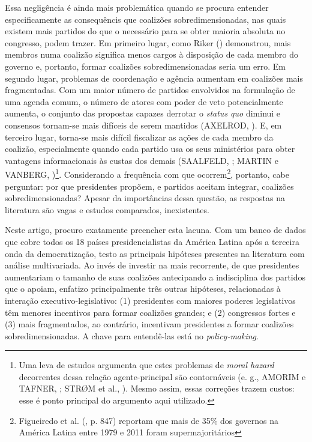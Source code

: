 Essa negligência é ainda mais problemática quando se procura entender especificamente as consequêncis que coalizões sobredimensionadas, nas quais existem mais partidos do que o necessário para se obter maioria absoluta no congresso, podem trazer. Em primeiro lugar, como Riker (\citeyear{riker1962}) demonstrou, mais membros numa coalizão significa menos cargos à disposição de cada membro do governo e, portanto, formar coalizões sobredimensionadas seria um erro. Em segundo lugar, problemas de coordenação e agência aumentam em coalizões mais fragmentadas. Com um maior número de partidos envolvidos na formulação de uma agenda comum, o número de atores com poder de veto potencialmente aumenta, o conjunto das propostas capazes derrotar o \textit{status quo} diminui e consensos tornam-se mais difíceis de serem mantidos (AXELROD, \citeyear{axelrod1970}). E, em terceiro lugar, torna-se mais difícil fiscalizar as ações de cada membro da coalizão, especialmente quando cada partido usa os seus ministérios para obter vantagens informacionais às custas dos demais (SAALFELD, \citeyear{saalfeld2000}; MARTIN e VANBERG, \citeyear{martin2011})\footnote{Uma leva de estudos argumenta que estes problemas de \textit{moral hazard} decorrentes dessa relação agente-principal são contornáveis (e. g., AMORIM e TAFNER, \citeyear{neto2002}; STR\O{}M et al., \citeyear{strom2010}). Mesmo assim, essas correções trazem custos: esse é ponto principal do argumento aqui utilizado.}. Considerando a frequência com que ocorrem\footnote{Figueiredo et al. (\citeyear{figueiredo2012}, p. 847) reportam que mais de 35\% dos governos na América Latina entre 1979 e 2011 foram supermajoritários}, portanto, cabe perguntar: por que presidentes propõem, e partidos aceitam integrar, coalizões sobredimensionadas? Apesar da importâncias dessa questão, as respostas na literatura são vagas e estudos comparados, inexistentes.
 
Neste artigo, procuro exatamente preencher esta lacuna. Com um banco de dados que cobre todos os 18 países presidencialistas da América Latina após a terceira onda da democratização, testo as principais hipóteses presentes na literatura com análise multivariada. Ao invés de investir na mais recorrente, de que presidentes aumentariam o tamanho de suas coalizões antecipando a indisciplina dos partidos que o apoiam, enfatizo principalmente três outras hipóteses, relacionadas à interação executivo-legislativo: (1) presidentes com maiores poderes legislativos têm menores incentivos para formar coalizões grandes; e (2) congressos fortes e (3) mais fragmentados, ao contrário, incentivam presidentes a formar coalizões sobredimensionadas. A chave para entendê-las está no \textit{policy-making}.

